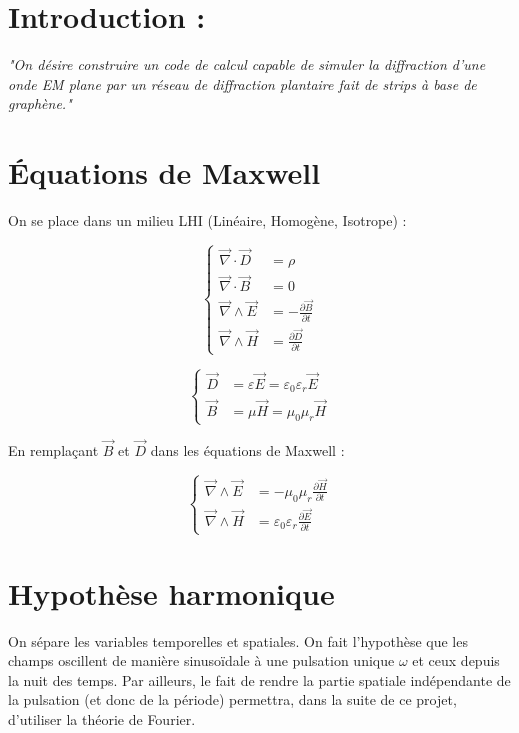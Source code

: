 \documentclass{article}
\begin{document}
\section*{Introduction :}
\bigskip
\textit{"On désire construire un code de calcul capable de simuler la diffraction d’une onde EM plane
par un réseau de diffraction plantaire fait de strips à base de graphène."
}
\section*{Équations de Maxwell}

On se place dans un milieu LHI (Linéaire, Homogène, Isotrope) :

\[
\left\{
\begin{aligned}
\vec{\nabla} \cdot \vec{D} &= \rho \\
\vec{\nabla} \cdot \vec{B} &= 0 \\
\vec{\nabla} \wedge \vec{E} &= -\frac{\partial \vec{B}}{\partial t} \\
\vec{\nabla} \wedge \vec{H} &= \frac{\partial \vec{D}}{\partial t}
\end{aligned}
\right.
\]


\[
\left\{
\begin{aligned}
\vec{D} &= \varepsilon \vec{E} = \varepsilon_0 \varepsilon_r \vec{E} \\
\vec{B} &= \mu \vec{H} = \mu_0 \mu_r \vec{H}
\end{aligned}
\right.
\]

En remplaçant \(\vec{B}\) et \(\vec{D}\) dans les équations de Maxwell :

\[
\left\{
\begin{aligned}
\vec{\nabla} \wedge \vec{E} &= - \mu_0 \mu_r \frac{\partial \vec{H}}{\partial t} \\
\vec{\nabla} \wedge \vec{H} &= \varepsilon_0 \varepsilon_r \frac{\partial \vec{E}}{\partial t}
\end{aligned}
\right.
\]

\section*{Hypothèse harmonique}

On sépare les variables temporelles et spatiales. On fait l’hypothèse que les champs oscillent de manière sinusoïdale à une pulsation unique \(\omega\) et ceux depuis la nuit des temps. Par ailleurs, le fait de rendre la partie spatiale indépendante de la pulsation (et donc de la période) permettra, dans la suite de ce projet, d'utiliser la théorie de Fourier.
\end{document}
